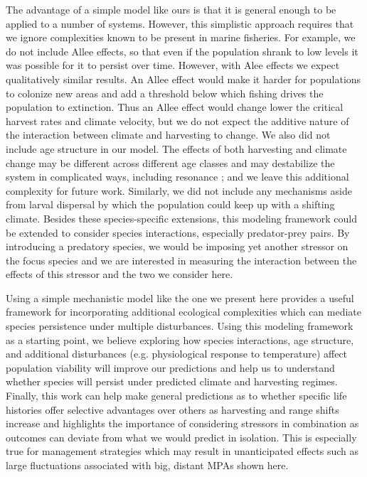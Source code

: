 \documentclass[12pt,english]{article}
\begin{document}
\begin{spacing}{1.9}
\begin{flushleft}
The advantage of a simple model like ours is that it is general enough to be applied to a number of systems.  However, this simplistic approach requires that we ignore complexities known to be present in marine fisheries. For example, we do not include Allee effects, so that even if the population shrank to low levels it was possible for it to persist over time. However, with Alee effects we expect qualitatively similar results. An Allee effect would make it harder for populations to colonize new areas and add a threshold below which fishing drives the population to extinction. Thus an Allee effect would change lower the critical harvest rates and climate velocity, but we do not expect the additive nature of the interaction between climate and harvesting to change.  We also did not include age structure in our model. The effects of both harvesting and climate change may be different across different age classes and may destabilize the system in complicated ways, including resonance \citep{Botsfordetal2011, Planqueetal2010}; and we leave this additional complexity for future work. Similarly, we did not include any mechanisms aside from larval dispersal by which the population could keep up with a shifting climate.  Besides these species-specific extensions, this modeling framework could be extended to consider species interactions, especially predator-prey pairs.  By introducing a predatory species, we would be imposing yet another stressor on the focus species \citep{Lingetal2009, Gurevitchetal2000} and we are interested in measuring the interaction between the effects of this stressor and the two we consider here.

Using a simple mechanistic model like the one we present here provides a useful framework for incorporating additional ecological complexities which can mediate species persistence under multiple disturbances. Using this modeling framework as a starting point, we believe exploring how species interactions, age structure, and additional disturbances (e.g. physiological response to temperature) affect population viability will improve our predictions and help us to understand whether species will persist under predicted climate and harvesting regimes. Finally, this work can help make general predictions as to whether specific life histories offer selective advantages over others as harvesting and range shifts increase and highlights the importance of considering stressors in combination as outcomes can deviate from what we would predict in isolation. This is especially true for management strategies which may result in unanticipated effects such as large fluctuations associated with big, distant MPAs shown here. 



\end{flushleft}
\end{spacing}
\end{document}
